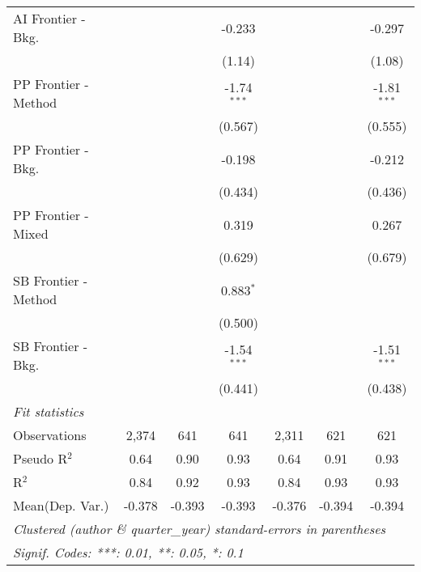 \begin{tabular}{lcccccc}
   AI Frontier - Bkg.   &              &         & -0.233        &               &               & -0.297\\   
                        &              &         & (1.14)        &               &               & (1.08)\\   
   PP Frontier - Method &              &         & -1.74$^{***}$ &               &               & -1.81$^{***}$\\   
                        &              &         & (0.567)       &               &               & (0.555)\\   
   PP Frontier - Bkg.   &              &         & -0.198        &               &               & -0.212\\   
                        &              &         & (0.434)       &               &               & (0.436)\\   
   PP Frontier - Mixed  &              &         & 0.319         &               &               & 0.267\\   
                        &              &         & (0.629)       &               &               & (0.679)\\   
   SB Frontier - Method &              &         & 0.883$^{*}$   &               &               &   \\   
                        &              &         & (0.500)       &               &               &   \\   
   SB Frontier - Bkg.   &              &         & -1.54$^{***}$ &               &               & -1.51$^{***}$\\   
                        &              &         & (0.441)       &               &               & (0.438)\\   
   \midrule
   \emph{Fit statistics}\\
   Observations         & 2,374        & 641     & 641           & 2,311         & 621           & 621\\  
   Pseudo R$^2$         & 0.64         & 0.90    & 0.93          & 0.64          & 0.91          & 0.93\\  
   R$^2$                & 0.84         & 0.92    & 0.93          & 0.84          & 0.93          & 0.93\\  
Mean(Dep. Var.) & -0.378 & -0.393 & -0.393 & -0.376 & -0.394 & -0.394 \\
   \midrule \midrule
   \multicolumn{7}{l}{\emph{Clustered (author \& quarter\_year) standard-errors in parentheses}}\\
   \multicolumn{7}{l}{\emph{Signif. Codes: ***: 0.01, **: 0.05, *: 0.1}}\\
\end{tabular}
\par\endgroup
